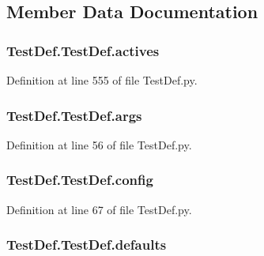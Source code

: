 \subsection{Member Data Documentation}
\hypertarget{classTestDef_1_1TestDef_a1eb766274fa9869e6b04e612e6d169b0}{
\subsubsection[{actives}]{\setlength{\rightskip}{0pt plus 5cm}Test\-Def.\-Test\-Def.\-actives}}\label{classTestDef_1_1TestDef_a1eb766274fa9869e6b04e612e6d169b0}


Definition at line 555 of file Test\-Def.\-py.

\hypertarget{classTestDef_1_1TestDef_a30e459036991de30822f267f1d882d44}{
\subsubsection[{args}]{\setlength{\rightskip}{0pt plus 5cm}Test\-Def.\-Test\-Def.\-args}}\label{classTestDef_1_1TestDef_a30e459036991de30822f267f1d882d44}


Definition at line 56 of file Test\-Def.\-py.

\hypertarget{classTestDef_1_1TestDef_a85a2e1fffeda060f750494dd4082594d}{
\subsubsection[{config}]{\setlength{\rightskip}{0pt plus 5cm}Test\-Def.\-Test\-Def.\-config}}\label{classTestDef_1_1TestDef_a85a2e1fffeda060f750494dd4082594d}


Definition at line 67 of file Test\-Def.\-py.

\hypertarget{classTestDef_1_1TestDef_a96d72418702f22844fc2fd5d774c7291}{
\subsubsection[{defaults}]{\setlength{\rightskip}{0pt plus 5cm}Test\-Def.\-Test\-Def.\-defaults}}\label{classTestDef_1_1TestDef_a96d72418702f22844fc2fd5d774c7291}


